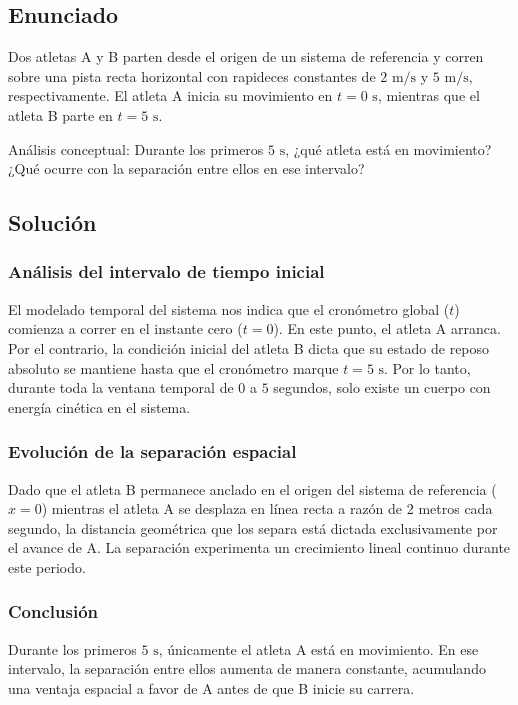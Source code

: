 \documentclass[12pt, a4paper]{article}
\begin{document}
\newpage
\subsection*{Enunciado}
 Dos atletas A y B parten desde el origen de un sistema de referencia y corren sobre una pista recta horizontal con rapideces constantes de $2\text{ m/s}$ y $5\text{ m/s}$, respectivamente. El atleta A inicia su movimiento en $t = 0\text{ s}$, mientras que el atleta B parte en $t = 5\text{ s}$.

Análisis conceptual: Durante los primeros $5\text{ s}$, ¿qué atleta está en movimiento? ¿Qué ocurre con la separación entre ellos en ese intervalo?

\subsection*{Solución}

\subsubsection*{Análisis del intervalo de tiempo inicial}
El modelado temporal del sistema nos indica que el cronómetro global ($t$) comienza a correr en el instante cero ($t=0$). En este punto, el atleta A arranca. Por el contrario, la condición inicial del atleta B dicta que su estado de reposo absoluto se mantiene hasta que el cronómetro marque $t=5\text{ s}$. Por lo tanto, durante toda la ventana temporal de $0$ a $5$ segundos, solo existe un cuerpo con energía cinética en el sistema.

\subsubsection*{Evolución de la separación espacial}
Dado que el atleta B permanece anclado en el origen del sistema de referencia ($x=0$) mientras el atleta A se desplaza en línea recta a razón de $2$ metros cada segundo, la distancia geométrica que los separa está dictada exclusivamente por el avance de A. La separación experimenta un crecimiento lineal continuo durante este periodo.

\subsubsection*{Conclusión}
Durante los primeros $5\text{ s}$, únicamente el atleta A está en movimiento. En ese intervalo, la separación entre ellos aumenta de manera constante, acumulando una ventaja espacial a favor de A antes de que B inicie su carrera.
\end{document}
